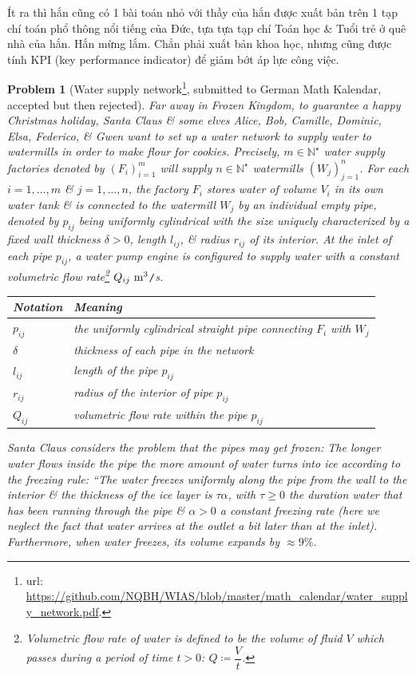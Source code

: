 \documentclass[12pt,oneside]{book}
\newtheorem{problem}{Problem}
\begin{document}
Ít ra thì hắn cũng có 1 bài toán nhỏ với thầy của hắn được xuất bản trên 1 tạp chí toán phổ thông nổi tiếng của Đức, tựa tựa tạp chí Toán học \& Tuổi trẻ ở quê nhà của hắn. Hắn mừng lắm. Chẳn phải xuất bản khoa học, nhưng cũng được tính KPI (key performance indicator) để giảm bớt áp lực công việc.

\begin{problem}[Water supply network\footnote{{\sc url}: \url{https://github.com/NQBH/WIAS/blob/master/math_calendar/water_supply_network.pdf}.}, submitted to German {\sc Math Kalendar}, accepted but then rejected]
	Far away in Frozen Kingdom, to guarantee a happy Christmas holiday, Santa Claus \& some elves Alice, Bob, Camille, Dominic, Elsa, Federico, \& Gwen want to set up a water network to supply water to watermills in order to make flour for cookies. Precisely, $m\in\mathbb{N}^\star$ water supply factories denoted by $(F_i)_{i=1}^m$ will supply $n\in\mathbb{N}^\star$ watermills $(W_j)_{j=1}^n$. For each $i = 1,\ldots,m$ \& $j = 1,\ldots,n$, the factory $F_i$ stores water of volume $V_i$ in its own water tank \& is connected to the watermill $W_j$ by an individual empty pipe, denoted by $p_{ij}$ being uniformly cylindrical with the size uniquely characterized by a fixed wall thickness $\delta > 0$, length $l_{ij}$, \& radius $r_{ij}$ of its interior. At the inlet of each pipe $p_{ij}$, a water pump engine is configured to supply water with a constant \emph{volumetric flow rate}\footnote{{\it Volumetric flow rate} of water is defined to be the volume of fluid $V$ which passes during a period of time $t > 0$: $Q\coloneqq\dfrac{V}{t}$.} $Q_{ij}\ {\rm m}^3${\tt/}{\rm s}.
	\begin{table}[H]
		\centering
		\begin{tabular}{|l|l|}
			\hline
			Notation & Meaning \\
			\hline
			$p_{ij}$ & the uniformly cylindrical straight pipe connecting $F_i$ with $W_j$ \\
			\hline
			$\delta$ & thickness of each pipe in the network \\
			\hline
			$l_{ij}$ & length of the pipe $p_{ij}$ \\
			\hline
			$r_{ij}$ & radius of the interior of pipe $p_{ij}$ \\
			\hline
			$Q_{ij}$ & volumetric ﬂow rate within the pipe $p_{ij}$ \\
			\hline
		\end{tabular}
	\end{table}
	Santa Claus considers the problem that the pipes may get frozen: The longer water flows inside the pipe the more amount of water turns into ice according to the \emph{freezing rule}: ``The water freezes uniformly along the pipe from the wall to the interior \& the thickness of the ice layer is $\tau\alpha$, with $\tau\ge0$ the duration water that has been running through the pipe \& $\alpha > 0$ a constant freezing rate (here we neglect the fact that water arrives at the outlet a bit later than at the inlet). Furthermore, when water freezes, its volume expands by $\approx9\%$.
	

\end{problem}
\end{document}
